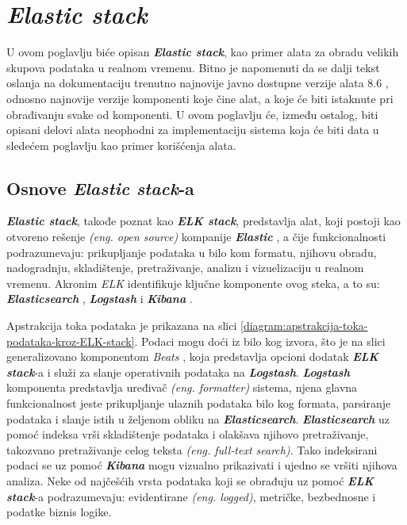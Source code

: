 \chapter{\textit{\textbf{Elastic stack}}}
U ovom poglavlju biće opisan \textit{\textbf{Elastic stack}}, kao primer alata za obradu velikih skupova podataka u realnom vremenu. Bitno je napomenuti da se dalji tekst oslanja na dokumentaciju trenutno najnovije javno dostupne verzije alata 8.6 \cite{elastic-stack-docs}, odnosno najnovije verzije komponenti koje čine alat, a koje će biti istaknute pri obrađivanju svake od komponenti. U ovom poglavlju će, između ostalog, biti opisani delovi alata neophodni za implementaciju sistema koja će biti data u sledećem poglavlju kao primer korišćenja alata.

\section{Osnove \textit{\textbf{Elastic stack}}-a}
\textit{\textbf{Elastic stack}}, takođe poznat kao \textit{\textbf{ELK stack}}, predstavlja alat, koji postoji kao otvoreno rešenje \textit{(eng. open source)} kompanije \textit{\textbf{Elastic}} \cite{elastic-site}, a čije funkcionalnosti podrazumevaju: prikupljanje podataka u bilo kom formatu, njihovu obradu, nadogradnju, skladištenje, pretraživanje, analizu i vizuelizaciju u realnom vremenu. Akronim \textit{ELK} identifikuje ključne komponente ovog steka, a to su: \textit{\textbf{Elasticsearch}} \cite{elastic-elasticsearch}, \textit{\textbf{Logstash}} \cite{elastic-logstash} i \textit{\textbf{Kibana}} \cite{elastic-kibana}.

\par
Apstrakcija toka podataka je prikazana na slici \ref{diagram:apstrakcija-toka-podataka-kroz-ELK-stack}. Podaci mogu doći iz bilo kog izvora, što je na slici generalizovano komponentom \textit{Beats} \cite{elastic-beats}, koja predstavlja opcioni dodatak \textit{\textbf{ELK stack}}-a i služi za slanje operativnih podataka na \textit{\textbf{Logstash}}. \textit{\textbf{Logstash}} komponenta predstavlja uređivač \textit{(eng. formatter)} sistema, njena glavna funkcionalnost jeste prikupljanje ulaznih podataka bilo kog formata, parsiranje podataka i slanje istih u željenom obliku na \textit{\textbf{Elasticsearch}}. \textit{\textbf{Elasticsearch}} uz pomoć indeksa vrši skladištenje podataka i olakšava njihovo pretraživanje, takozvano pretraživanje celog teksta \textit{(eng. full-text search)}. Tako indeksirani podaci se uz pomoć \textit{\textbf{Kibana}} mogu vizualno prikazivati i ujedno se vršiti njihova analiza.
Neke od najčešćih vrsta podataka koji se obrađuju uz pomoć \textit{\textbf{ELK stack}}-a podrazumevaju: evidentirane \textit{(eng. logged)}, metričke, bezbednosne i podatke biznis logike.


